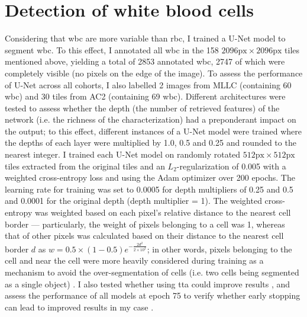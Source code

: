 \begin{figure}[!ht]
    \label{fig:rbc-quality-tiles}
\end{figure}

\section{Detection of white blood cells}

Considering that \ac{wbc} are more variable than \ac{rbc}, I trained a U-Net model \cite{Ronneberger2015-do} to segment \ac{wbc}. To this effect, I annotated all \ac{wbc} in the 158 $2096\mathrm{px} \times 2096\mathrm{px}$ tiles mentioned above, yielding a total of 2853 annotated \ac{wbc}, 2747 of which were completely visible (no pixels on the edge of the image). To assess the performance of U-Net across all cohorts, I also labelled 2 images from MLLC (containing 60 \ac{wbc}) and 30 tiles from AC2 (containing 69 \ac{wbc}). Different architectures were tested to assess whether the depth (the number of retrieved features) of the network (i.e. the richness of the characterization) had a preponderant impact on the output; to this effect, different instances of a U-Net model were trained where the depths of each layer were multiplied by 1.0, 0.5 and 0.25 and rounded to the nearest integer. I trained each U-Net model on randomly rotated $512\mathrm{px} \times 512\mathrm{px}$ tiles extracted from the original tiles and an $L_2$-regularization of 0.005 with a weighted cross-entropy loss and using the Adam optimizer \cite{Kingma2014-zd} over 200 epochs. The learning rate for training was set to 0.0005 for depth multipliers of 0.25 and 0.5 and 0.0001 for the original depth (depth multiplier = 1). The weighted cross-entropy was weighted based on each pixel's relative distance to the nearest cell border --- particularly, the weight of pixels belonging to a cell was 1, whereas that of other pixels was calculated based on their distance to the nearest cell border $d$ as $w = 0.5 \times (1-0.5)e^{-\frac{2d^2}{2 \times 10^2}}$; in other words, pixels belonging to the cell and near the cell were more heavily considered during training as a mechanism to avoid the over-segmentation of cells (i.e. two cells being segmented as a single object) \cite{Ronneberger2015-do}. I also tested whether using \ac{tta} could improve results \cite{Moshkov2020-rc}, and assess the performance of all models at epoch 75 to verify whether early stopping can lead to improved results in my case \cite{Prechelt2012-xf}. 

